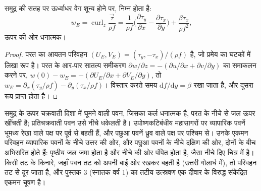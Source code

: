 \begin{proposition}[एकमन पंपन]\label{prop:b3:ocean-dynamics:pumping}
समुद्र की सतह पर ऊर्ध्वाधर वेग शून्य होने पर,  निम्न होता है:
\[
w_E = \operatorname{curl}_z\frac{\vec\tau}{\rho f}
= \frac{1}{\rho f}\Big(\frac{\partial\tau_y}{\partial x} -
\frac{\partial\tau_x}{\partial y}\Big) + \frac{\beta\tau_x}{\rho f^2} ,
\]
ऊपर की ओर धनात्मक।
\end{proposition}

\begin{proof}
परत का आयतन परिवहन $(U_E, V_E) = (\tau_y,
-\tau_x)/(\rho f)$ है, जो प्रमेय का घटकों में लिखा रूप है। परत के आर-पार
सातत्य समीकरण $\partial w/\partial z = -(\partial u/\partial x +
\partial v/\partial y)$ का समाकलन करने पर, $w(0) - w_E = -(\partial
U_E/\partial x + \partial V_E/\partial y)$, तो $w_E = \partial_x(\tau_y/\rho
f) - \partial_y(\tau_x/\rho f)$। विस्तार करते समय $\mathrm df/\mathrm dy =
\beta$ रखा जाता है, और दूसरा रूप प्राप्त होता है।
\end{proof}

समुद्र के ऊपर चक्रवाती दिशा में घूमने वाली पवन, जिसका कर्ल धनात्मक है,
परत के नीचे से जल ऊपर खींचती है; प्रतिचक्रवाती पवन उसे नीचे धकेलती है। उपोष्णकटिबंधीय
महासागरों पर व्यापारिक पवनें भूमध्य रेखा वाले पक्ष पर पूर्व से बहती हैं,
और पछुआ पवनें ध्रुव वाले पक्ष पर पश्चिम से। उनके एकमन परिवहन
व्यापारिक पवनों के नीचे उत्तर की ओर, और पछुआ पवनों के नीचे दक्षिण की ओर,
दोनों के बीच अभिसरित होते हैं: पृष्ठीय जल जमा होता है और नीचे की ओर पंपित होता है, जैसा
नीचे दिए चित्र में है। किसी तट के किनारे, जहाँ
पवन तट को अपनी बाईं ओर रखकर बहती है (उत्तरी गोलार्ध में), तो
परिवहन तट से दूर जाता है, और पुस्तक 3 (स्नातक वर्ष 1) का तटीय उत्स्रवण
एक दीवार के विरुद्ध संकेंद्रित एकमन चूषण है।


